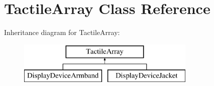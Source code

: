 \hypertarget{classTactileArray}{
\section{TactileArray Class Reference}
\label{classTactileArray}
}
Inheritance diagram for TactileArray:\begin{figure}[H]
\begin{center}
\leavevmode
\includegraphics[height=2.000000cm]{classTactileArray}
\end{center}
\end{figure}
